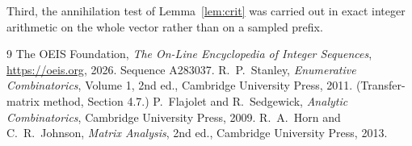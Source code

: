 \documentclass[11pt,a4paper]{article}
\theoremstyle{plain}
\theoremstyle{definition}
\begin{document}
Third, the annihilation test of Lemma~\ref{lem:crit} was carried out in exact integer
arithmetic on the whole vector rather than on a sampled prefix.

\begin{thebibliography}{9}
 The OEIS Foundation, \emph{The On-Line Encyclopedia of Integer
Sequences}, \url{https://oeis.org}, 2026. Sequence A283037.
 R.~P.~Stanley, \emph{Enumerative Combinatorics}, Volume 1, 2nd ed.,
Cambridge University Press, 2011. (Transfer-matrix method, Section 4.7.)
 P.~Flajolet and R.~Sedgewick, \emph{Analytic Combinatorics}, Cambridge
University Press, 2009.
 R.~A.~Horn and C.~R.~Johnson, \emph{Matrix Analysis}, 2nd ed., Cambridge
University Press, 2013.
\end{thebibliography}
\end{document}
